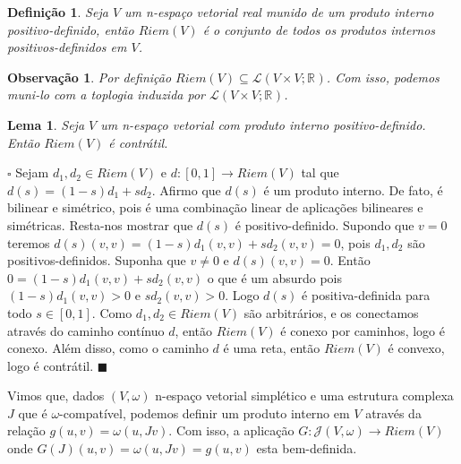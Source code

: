 \documentclass[12pt]{book}
\newtheorem{lema}[teorema]{Lema}
\newtheorem{definicao}[teorema]{Definição}
\newtheorem{observacao}[teorema]{Observação}
\newenvironment{prova}[1]{$\square$ #1}{\hfill$\blacksquare$}
\newcommand{\estruturascomplexaspadrao}{\mathcal{J}(V, \omega)}
\newcommand{\intervalo}{[0,1]}
\newcommand{\produtosinternos}[1]{Riem(#1)}
\newcommand{\real}[1]{\mathbb{R}^{#1}}
\begin{document}
	\begin{definicao}
		Seja $V$ um n-espaço vetorial real munido de um produto interno positivo-definido, então $\produtosinternos{V}$ é o conjunto de todos os produtos internos positivos-definidos em $V$.
	\end{definicao}
	
	\begin{observacao}
		Por definição $\produtosinternos{V} \subseteq \mathcal{L}(V \times V; \real{})$. Com isso, podemos muni-lo com a toplogia induzida por $\mathcal{L}(V \times V; \real{})$.
	\end{observacao} 
	
	\begin{lema}\label{lema_contratibilidade_produtos_internos}
		Seja $V$ um n-espaço vetorial com produto interno positivo-definido. Então $\produtosinternos{V}$ é contrátil.
	\end{lema}
	\begin{prova}
		Sejam $d_{1},d_{2} \in \produtosinternos{V}$ e $d:\intervalo\to \produtosinternos{V}$ tal que $d(s) = (1-s)d_{1}+ s d_{2}$. Afirmo que $d(s)$ é um produto interno. De fato, é bilinear e simétrico, pois é uma combinação linear de aplicações bilineares e simétricas. Resta-nos mostrar que $d(s)$ é positivo-definido. Supondo que $v =0$ teremos $d(s)(v,v)=(1-s)d_{1}(v,v)+ s d_{2}(v,v)  =0$, pois $d_{1}, d_{2}$ são positivos-definidos. Suponha que $v\neq 0$ e $d(s)(v,v) = 0$. Então $0=(1-s)d_{1}(v,v)+ s d_{2}(v,v)  $ o que é um absurdo pois $(1-s)d_{1}(v,v)>0 $ e $sd_{2}(v,v)> 0$. Logo $d(s)$ é positiva-definida para todo $s \in \intervalo$. Como $d_{1}, d_{2} \in \produtosinternos{V}$ são arbitrários, e os conectamos através do caminho contínuo $d$, então $\produtosinternos{V}$ é conexo por caminhos, logo é conexo. Além disso, como o caminho $d$ é uma reta, então $\produtosinternos{V}$ é convexo, logo é contrátil.
	\end{prova}
	
	Vimos que, dados $(V, \omega)$ n-espaço vetorial simplético e uma estrutura complexa $J$ que é $\omega$-compatível, podemos definir um produto interno em $V$ através da relação $g(u,v) = \omega(u,Jv)$. Com isso, a aplicação $G:\estruturascomplexaspadrao \to \produtosinternos{V}$ onde $G(J)(u,v) = \omega(u,Jv) = g(u,v)$ esta bem-definida.
	
\end{document}
